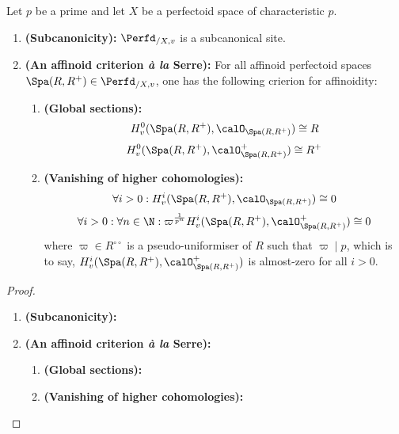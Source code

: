                 \begin{proposition} \label{prop: properties_of_the_v_topology} 
                    Let $p$ be a prime and let $X$ be a perfectoid space of characteristic $p$. 
                        \begin{enumerate}
                            \item \textbf{(Subcanonicity):} $\Perfd_{/X, v}$ is a subcanonical site.
                            \item \textbf{(An affinoid criterion \textit{\`a la} Serre):} For all affinoid perfectoid spaces $\Spa(R, R^+) \in \Perfd_{/X, v}$, one has the following crierion for affinoidity:
                                \begin{enumerate}
                                    \item \textbf{(Global sections):} 
                                        $$H^0_v(\Spa(R, R^+), \calO_{\Spa(R, R^+)}) \cong R$$
                                        $$H^0_v(\Spa(R, R^+), \calO^+_{\Spa(R, R^+)}) \cong R^+$$
                                    \item \textbf{(Vanishing of higher cohomologies):}
                                        $$\forall i > 0: H^i_v(\Spa(R, R^+), \calO_{\Spa(R, R^+)}) \cong 0$$
                                        $$\forall i > 0: \forall n \in \N: \varpi^{\frac{1}{p^n}} H^i_v(\Spa(R, R^+), \calO^+_{\Spa(R, R^+)}) \cong 0$$
                                    where $\varpi \in R^{\circ \circ}$ is a pseudo-uniformiser of $R$ such that $\varpi \mid p$, which is to say, $H^i_v(\Spa(R, R^+), \calO^+_{\Spa(R, R^+)})$ is almost-zero for all $i > 0$.
                                \end{enumerate}
                        \end{enumerate}
                \end{proposition}
                    \begin{proof}
                        \noindent
                        \begin{enumerate}
                            \item \textbf{(Subcanonicity):}
                            \item \textbf{(An affinoid criterion \textit{\`a la} Serre):} 
                                \begin{enumerate}
                                    \item \textbf{(Global sections):} 
                                    \item \textbf{(Vanishing of higher cohomologies):}
                                \end{enumerate}
                        \end{enumerate} 
                    \end{proof}
                    
